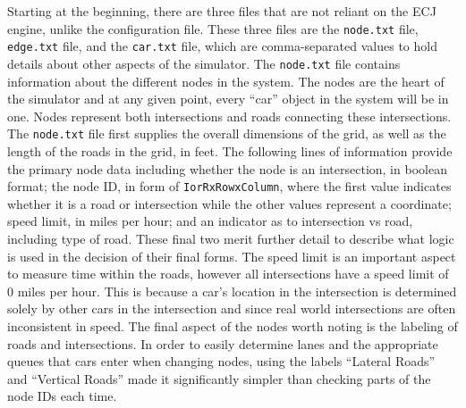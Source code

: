 Starting at the beginning, there are three files that are not reliant on the ECJ engine, unlike the configuration file.  These three files are the \texttt{node.txt} file, \texttt{edge.txt} file, and the \texttt{car.txt} file, which are comma-separated values to hold details about other aspects of the simulator.  The \texttt{node.txt} file contains information about the different nodes in the system.  The nodes are the heart of the simulator and at any given point, every ``car'' object in the system will be in one.  Nodes represent both intersections and roads connecting these intersections.  The \texttt{node.txt} file first supplies the overall dimensions of the grid, as well as the length of the roads in the grid, in feet.  The following lines of information provide the primary node data including whether the node is an intersection, in boolean format; the node ID, in form of \texttt{IorRxRowxColumn}, where the first value indicates whether it is a road or intersection while the other values represent a coordinate;  speed limit, in miles per hour; and an indicator as to intersection vs road, including type of road.  These final two merit further detail to describe what logic is used in the decision of their final forms.  The speed limit is an important aspect to measure time within the roads, however all intersections have a speed limit of 0 miles per hour.  This is because a car's location in the intersection is determined solely by other cars in the intersection and since real world intersections are often inconsistent in speed.  The final aspect of the nodes worth noting is the labeling of roads and intersections.  In order to easily determine lanes and the appropriate queues that cars enter when changing nodes, using the labels ``Lateral Roads'' and ``Vertical Roads'' made it significantly simpler than checking parts of the node IDs each time.  

